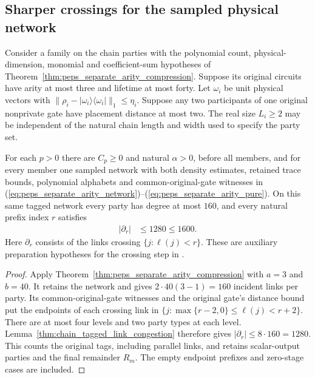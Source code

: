 \subsection{Sharper crossings for the sampled physical network}

\begin{lemma}
    \label{thm:chain_sharp_sampled_crossings}
    \leanok
    Consider a family on the chain parties with the polynomial count,
    physical-dimension, monomial and coefficient-sum hypotheses of
    Theorem~\ref{thm:peps_separate_arity_compression}. Suppose its
    original circuits have arity at most three and lifetime at most
    forty. Let $\omega_i$ be unit physical vectors with
    $\|\rho_i-|\omega_i\rangle\langle\omega_i|\|_1\le\eta_i$.
    Suppose any two participants of one original nonprivate gate
    have placement distance at most two.
    The real size $L_i\ge2$ may be independent of the natural chain
    length and width used to specify the party set.

    For each $p>0$ there are $C_p\ge0$ and natural $\alpha>0$,
    before all members, and for every member one sampled
    network with both density estimates, retained trace bounds,
    polynomial alphabets and common-original-gate witnesses in
    (\ref{eq:peps_separate_arity_network})--(\ref{eq:peps_separate_arity_pure}).
    On this same tagged network every party has degree at most
    $160$, and every natural prefix index $r$ satisfies
    \begin{align}
        |\partial_r| & \le1280\le1600.
        \label{eq:chain_sharp_sampled_crossings}
    \end{align}
    Here $\partial_r$ consists of the links crossing
    $\{j:\ell(j)<r\}$. These are auxiliary preparation hypotheses
    for the crossing step in
    \cite[Part~II, proof of Theorem~B]{TNLean2026OneDimensional}.
\end{lemma}
\begin{proof}\leanok
    Apply Theorem~\ref{thm:peps_separate_arity_compression} with
    $a=3$ and $b=40$. It retains the network and gives
    $2\cdot40(3-1)=160$ incident links per party.
    Its common-original-gate witnesses and the original gate's
    distance bound put the endpoints of each crossing link in
    $\{j:\max\{r-2,0\}\le\ell(j)<r+2\}$.
    There are at most four levels and two party types at each level.
    Lemma~\ref{thm:chain_tagged_link_congestion} therefore gives
    $|\partial_r|\le8\cdot160=1280$.
    This counts the original tags, including parallel links, and
    retains scalar-output parties and the final remainder $R_m$.
    The empty endpoint prefixes and zero-stage cases are included.
\end{proof}

